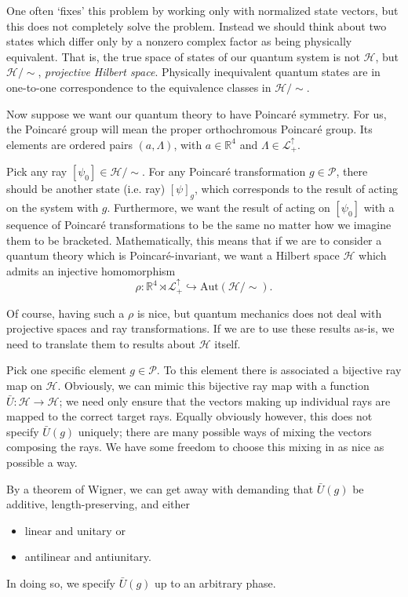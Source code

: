 \documentclass[a4paper,10pt]{scrreprt}
\newcommand{\R}{\mathbb{R}}
\theoremstyle{definition}
\theoremstyle{plain}
\theoremstyle{remark}
\begin{document}
One often `fixes' this problem by working only with normalized state vectors, but this does not completely solve the problem. Instead we should think about two states which differ only by a nonzero complex factor as being physically equivalent. That is, the true space of states of our quantum system is not $\mathscr{H}$, but $\mathscr{H} / \sim$, \emph{projective Hilbert space}. Physically inequivalent quantum states are in one-to-one correspondence to the equivalence classes in $\mathscr{H}/\sim$.

Now suppose we want our quantum theory to have Poincar{\'e} symmetry. For us, the Poincar{\'e} group will mean the proper orthochromous Poincar{\'e} group. Its elements are ordered pairs $(a, \Lambda)$, with $a \in \R^{4}$ and $\Lambda \in \mathcal{L}^{\uparrow}_{+}$.

Pick any ray $[\psi_{0}] \in \mathscr{H}/\sim$. For any Poincar{\'e} transformation $g \in \mathcal{P}$, there should be another state (i.e. ray) $[\psi]_{g}$, which corresponds to the result of acting on the system with $g$. Furthermore, we want the result of acting on $[\psi_{0}]$ with a sequence of Poincar{\'e} transformations to be the same no matter how we imagine them to be bracketed. Mathematically, this means that if we are to consider a quantum theory which is Poincar{\'e}-invariant, we want a Hilbert space $\mathscr{H}$ which admits an injective homomorphism
\begin{equation*}
  \rho\colon \R^{4} \rtimes \mathcal{L}^{\uparrow}_{+} \hookrightarrow \mathrm{Aut}(\mathscr{H}/\sim).
\end{equation*}

Of course, having such a $\rho$ is nice, but quantum mechanics does not deal with projective spaces and ray transformations. If we are to use these results as-is, we need to translate them to results about $\mathscr{H}$ itself.

Pick one specific element $g \in \mathcal{P}$. To this element there is associated a bijective ray map on $\mathscr{H}$. Obviously, we can mimic this bijective ray map with a function $\bar{U}\colon \mathscr{H} \to \mathscr{H}$; we need only ensure that the vectors making up individual rays are mapped to the correct target rays. Equally obviously however, this does not specify $\bar{U}(g)$ uniquely; there are many possible ways of mixing the vectors composing the rays. We have some freedom to choose this mixing in as nice as possible a way.

By a theorem of Wigner, we can get away with demanding that $\bar{U}(g)$ be additive, length-preserving, and either
\begin{itemize}
  \item linear and unitary or
  \item antilinear and antiunitary.
\end{itemize}
In doing so, we specify $\bar{U}(g)$ up to an arbitrary phase.
\end{document}
